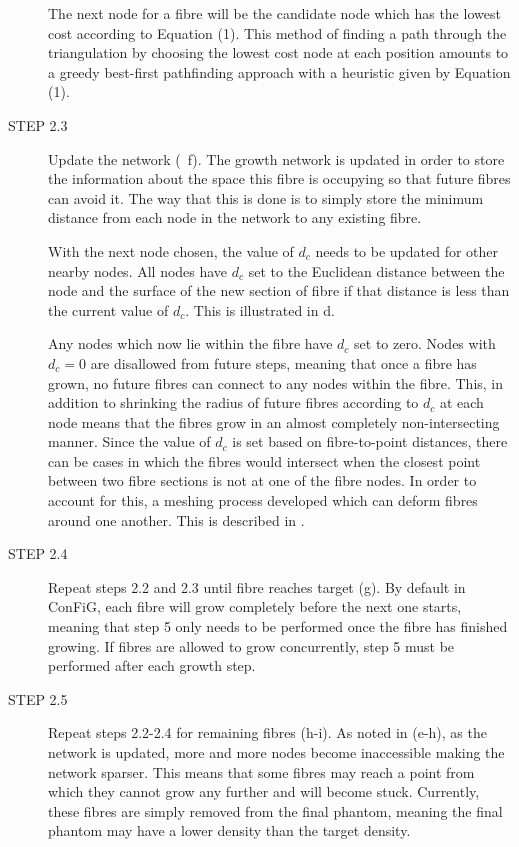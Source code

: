 \begin{description}
The next node for a fibre will be the candidate node which has the lowest cost according to Equation (1). This method of finding a path through the triangulation by choosing the lowest cost node at each position amounts to a greedy best-first pathfinding approach with a heuristic given by Equation (1).

  \item [STEP 2.3] Update the network (~f). The growth network is updated in order to store the information about the space this fibre is occupying so that future fibres can avoid it. The way that this is done is to simply store the minimum distance from each node in the network to any existing fibre.

With the next node chosen, the value of $d_c$ needs to be updated for other nearby nodes.
All nodes have $d_c$ set to the Euclidean distance between the node and the surface of the new section of fibre if that distance is less than the current value of $d_c$. This is illustrated in d.

Any nodes which now lie within the fibre have $d_c$ set to zero.
Nodes with $d_c = 0$ are disallowed from future steps, meaning that once a fibre has grown, no future fibres can connect to any nodes within the fibre.
This, in addition to shrinking the radius of future fibres according to $d_c$ at each node means that the fibres grow in an almost completely  non-intersecting manner.
Since the value of $d_c$ is set based on fibre-to-point distances, there can be cases in which the fibres would intersect when the closest point between two fibre sections is not at one of the fibre nodes.
In order to account for this, a meshing process developed which can deform fibres around one another. This is described in .

  \item [STEP 2.4] Repeat steps 2.2 and 2.3 until fibre reaches target (g). By default in ConFiG, each fibre will grow completely before the next one starts, meaning that step 5 only needs to be performed once the fibre has finished growing. If fibres are allowed to grow concurrently, step 5 must be performed after each growth step.

  \item [STEP 2.5] Repeat steps 2.2-2.4 for remaining fibres (h-i). As noted in  (e-h), as the network is updated, more and more nodes become inaccessible making the network sparser. This means that some fibres may reach a point from which they cannot grow any further and will become stuck. Currently, these fibres are simply removed from the final phantom, meaning the final phantom may have a lower density than the target density.
\end{description}



